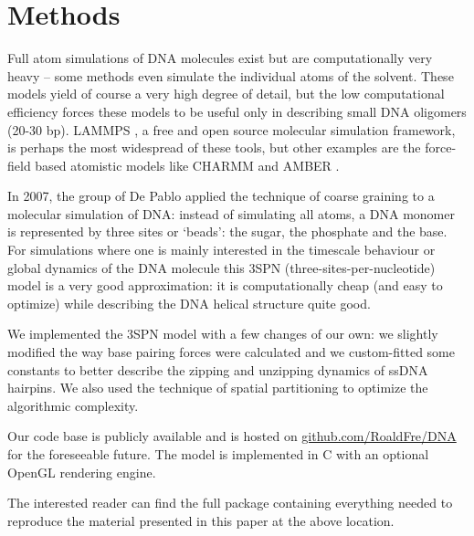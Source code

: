 \section{Methods}

Full atom simulations of DNA molecules exist but are computationally very heavy -- some methods even simulate the individual atoms of the solvent. These models yield of course a very high degree of detail, but the low computational efficiency forces these models to be useful only in describing small DNA oligomers (20-30 bp). LAMMPS \cite{plimpton2007lammps}, a free and open source molecular simulation framework, is perhaps the most widespread of these tools, but other examples are the force-field based atomistic models like CHARMM \cite{brooks2009charmm} and AMBER \cite{cheatham1999modified}.

In 2007, the group of De Pablo \cite{knotts2007coarse} applied the technique of coarse graining to a molecular simulation of DNA: instead of simulating all atoms, a DNA monomer is represented by three sites or `beads': the sugar, the phosphate and the base. For simulations where one is mainly interested in the timescale behaviour or global dynamics of the DNA molecule this 3SPN (three-sites-per-nucleotide) model is a very good approximation: it is computationally cheap (and easy to optimize) while describing the DNA helical structure quite good. 

We implemented the 3SPN model with a few changes of our own: we slightly modified the way base pairing forces were calculated and we custom-fitted some constants to better describe the zipping and unzipping dynamics of ssDNA hairpins. We also used the technique of spatial partitioning to optimize the algorithmic complexity.

Our code base is publicly available and is hosted on \href{https://github.com/RoaldFre/DNA}{github.com/RoaldFre/DNA} for the foreseeable future. The model is implemented in C with an optional OpenGL rendering engine.

The interested reader can find the full package containing everything needed to reproduce the material presented in this paper at the above location.












